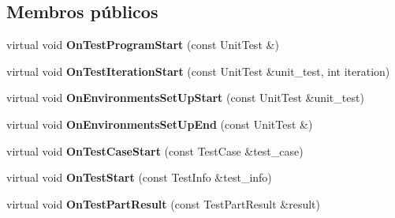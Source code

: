 \subsection*{Membros públicos}
\begin{DoxyCompactItemize}
\item 
\hypertarget{classtesting_1_1internal_1_1PrettyUnitTestResultPrinter_a7a6b6de195b4ef3c9f2edd2e6c270f3e}{virtual void {\bfseries On\-Test\-Program\-Start} (const Unit\-Test \&)}\label{classtesting_1_1internal_1_1PrettyUnitTestResultPrinter_a7a6b6de195b4ef3c9f2edd2e6c270f3e}

\item 
\hypertarget{classtesting_1_1internal_1_1PrettyUnitTestResultPrinter_abdba10a8c97e272ab4cee97cb652c957}{virtual void {\bfseries On\-Test\-Iteration\-Start} (const Unit\-Test \&unit\-\_\-test, int iteration)}\label{classtesting_1_1internal_1_1PrettyUnitTestResultPrinter_abdba10a8c97e272ab4cee97cb652c957}

\item 
\hypertarget{classtesting_1_1internal_1_1PrettyUnitTestResultPrinter_a846a5e82b421e04fcdd2b1b2b64b162f}{virtual void {\bfseries On\-Environments\-Set\-Up\-Start} (const Unit\-Test \&unit\-\_\-test)}\label{classtesting_1_1internal_1_1PrettyUnitTestResultPrinter_a846a5e82b421e04fcdd2b1b2b64b162f}

\item 
\hypertarget{classtesting_1_1internal_1_1PrettyUnitTestResultPrinter_aadba892f02606a8b0c5f5982b3553aac}{virtual void {\bfseries On\-Environments\-Set\-Up\-End} (const Unit\-Test \&)}\label{classtesting_1_1internal_1_1PrettyUnitTestResultPrinter_aadba892f02606a8b0c5f5982b3553aac}

\item 
\hypertarget{classtesting_1_1internal_1_1PrettyUnitTestResultPrinter_adcb68c729565d4bcdf8418a52902c3de}{virtual void {\bfseries On\-Test\-Case\-Start} (const Test\-Case \&test\-\_\-case)}\label{classtesting_1_1internal_1_1PrettyUnitTestResultPrinter_adcb68c729565d4bcdf8418a52902c3de}

\item 
\hypertarget{classtesting_1_1internal_1_1PrettyUnitTestResultPrinter_a5078ee71cfa97e37ae7a9366149195c5}{virtual void {\bfseries On\-Test\-Start} (const Test\-Info \&test\-\_\-info)}\label{classtesting_1_1internal_1_1PrettyUnitTestResultPrinter_a5078ee71cfa97e37ae7a9366149195c5}

\item 
\hypertarget{classtesting_1_1internal_1_1PrettyUnitTestResultPrinter_a7589e8df7485349498a3a81bf16e2f68}{virtual void {\bfseries On\-Test\-Part\-Result} (const Test\-Part\-Result \&result)}\label{classtesting_1_1internal_1_1PrettyUnitTestResultPrinter_a7589e8df7485349498a3a81bf16e2f68}


\end{DoxyCompactItemize}
